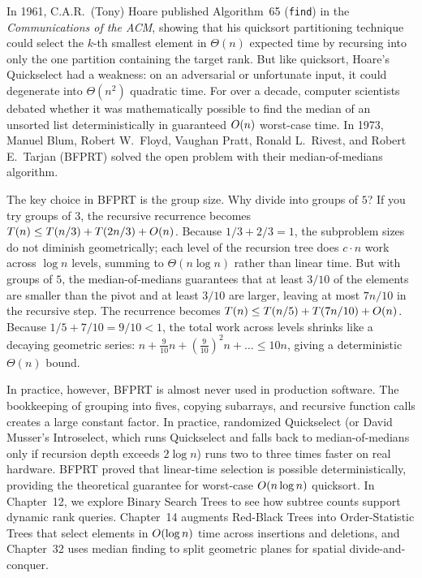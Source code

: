 \begin{historybox}
In 1961, C.A.R.\ (Tony) Hoare published Algorithm~65 (\lstinline|find|) in the
\emph{Communications of the ACM}, showing that his quicksort partitioning technique could select the
$k$-th smallest element in $\Theta(n)$ expected time by recursing into only the one partition
containing the target rank. But like quicksort, Hoare's Quickselect had a
weakness: on an adversarial or unfortunate input, it could degenerate into $\Theta(n^2)$ quadratic time.
For over a decade, computer scientists debated whether it was mathematically possible to find the
median of an unsorted list deterministically in guaranteed $O(n)$ worst-case time. In 1973,
Manuel Blum, Robert W.\ Floyd, Vaughan Pratt, Ronald L.\ Rivest, and Robert E.\ Tarjan (BFPRT)
solved the open problem with their median-of-medians algorithm.

The key choice in BFPRT is the group size. Why divide into groups of $5$? If
you try groups of $3$, the recursive recurrence becomes $T(n) \le T(n/3) + T(2n/3) + O(n)$.
Because $1/3 + 2/3 = 1$, the subproblem sizes do not diminish geometrically; each level of the
recursion tree does $c \cdot n$ work across $\log n$ levels, summing to $\Theta(n \log n)$ rather
than linear time. But with groups of $5$, the median-of-medians guarantees that at
least $3/10$ of the elements are smaller than the pivot and at least $3/10$ are larger, leaving at
most $7n/10$ in the recursive step. The recurrence becomes $T(n) \le T(n/5) + T(7n/10) + O(n)$.
Because $1/5 + 7/10 = 9/10 < 1$, the total work across levels shrinks like a decaying geometric
series: $n + \frac{9}{10}n + (\frac{9}{10})^2 n + \dots \le 10n$, giving a deterministic
$\Theta(n)$ bound.

In practice, however, BFPRT is almost never used in production software. The bookkeeping of grouping into fives, copying
subarrays, and recursive function calls creates a large constant factor. In practice, randomized
Quickselect (or David Musser's Introselect, which runs Quickselect and falls back to
median-of-medians only if recursion depth exceeds $2 \log n$) runs two to three times faster on
real hardware. BFPRT proved that linear-time selection is possible deterministically,
providing the theoretical guarantee for worst-case $O(n \log n)$ quicksort. In Chapter~12, we
explore Binary Search Trees to see how subtree counts support dynamic rank queries. Chapter~14
augments Red-Black Trees into Order-Statistic Trees that select elements in $O(\log n)$ time
across insertions and deletions, and Chapter~32 uses median finding to split geometric planes for
spatial divide-and-conquer.
\end{historybox}

